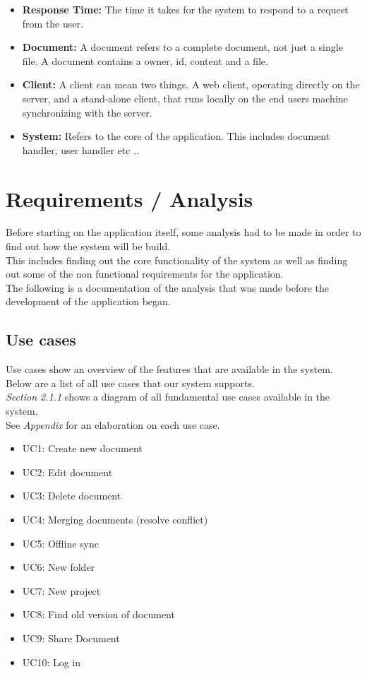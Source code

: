 \documentclass[11pt]{article}
\begin{document}
\begin{itemize}
\item \textbf{Response Time:} The time it takes for the system to respond to a request from the user.
\item \textbf{Document:} A document refers to a complete document, not just a single file. A document contains a owner, id, content and a file.
\item \textbf{Client:} A client can mean two things. A web client, operating directly on the server, and a stand-alone client, that runs locally on the end users machine synchronizing with the server.
\item \textbf{System:} Refers to the core of the application. This includes document handler, user handler etc ..
\end{itemize}
\section{Requirements / Analysis}
\label{sec-2}
Before starting on the application itself, some analysis had to be made in order to find out how the system will be build. \\
This includes finding out the core functionality of the system as well as finding out some of the non functional requirements for the application. \\
The following is a documentation of the analysis that was made before the development of the application began.
\subsection{Use cases}
\label{sec-2-1}
Use cases show an overview of the features that are available in the system. Below are a list of all use cases that our system supports. \\
\emph{Section 2.1.1} shows a diagram of all fundamental use cases available in the system. \\
See \emph{Appendix} for an elaboration on each use case. \\

\begin{itemize}
\item UC1: Create new document
\item UC2: Edit document
\item UC3: Delete document
\item UC4: Merging documents (resolve conflict)
\item UC5: Offline sync
\item UC6: New folder
\item UC7: New project
\item UC8: Find old version of document
\item UC9: Share Document
\item UC10: Log in
\end{itemize}
\end{document}
